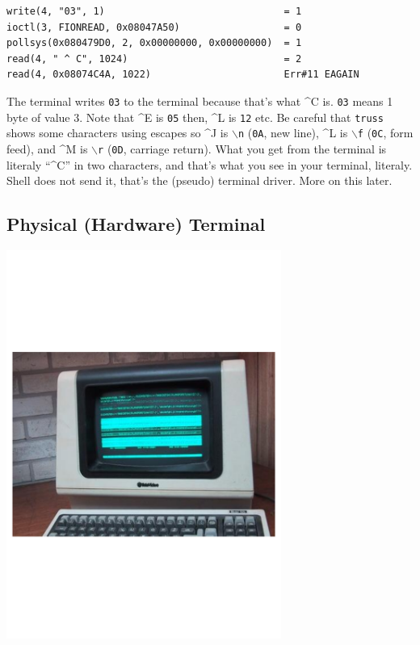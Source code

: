 \begin{itemize}
\begin{verbatim}
write(4, "03", 1)                               = 1
ioctl(3, FIONREAD, 0x08047A50)                  = 0
pollsys(0x080479D0, 2, 0x00000000, 0x00000000)  = 1
read(4, " ^ C", 1024)                           = 2
read(4, 0x08074C4A, 1022)                       Err#11 EAGAIN
\end{verbatim}

The terminal writes \texttt{03} to the terminal because that's what \^{}C is.
\texttt{03} means 1 byte of value 3. Note that \^{}E is \texttt{05} then, \^{}L
is \texttt{12} etc. Be careful that \texttt{truss} shows some characters using
escapes so \^{}J is $\backslash$\texttt{n} (\texttt{0A}, new line), \^{}L is
$\backslash$\texttt{f} (\texttt{0C}, form feed), and \^{}M is
$\backslash$\texttt{r} (\texttt{0D}, carriage return). What you get from the
terminal is literaly ``\^{}C'' in two characters, and that's what you see in
your terminal, literaly. Shell does not send it, that's the (pseudo) terminal
driver. More on this later.
\end{itemize}

\subsection{Physical (Hardware) Terminal}

\begin{center}
\includegraphics[width=90mm]{img/terminals/Televideo925Terminal.pdf}
\end{center}

